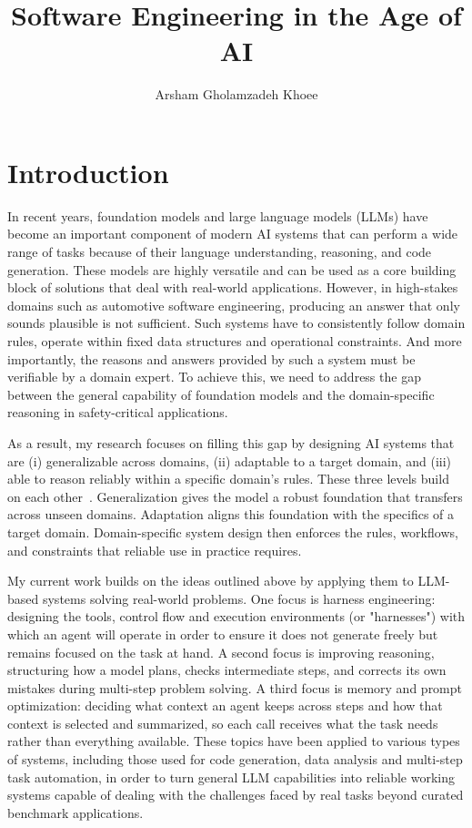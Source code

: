 \documentclass[11pt]{article}
\title{\vspace{-3em}Software Engineering in the Age of AI}
\author{Arsham Gholamzadeh Khoee}
\date{}
\begin{document}
\maketitle
\vspace{-2em}


\section{Introduction}

In recent years, foundation models and large language models (LLMs) have become an important component of modern AI systems that can perform a wide range of tasks because of their language understanding, reasoning, and code generation. These models are highly versatile and can be used as a core building block of solutions that deal with real-world applications. However, in high-stakes domains such as automotive software engineering, producing an answer that only sounds plausible is not sufficient. Such systems have to consistently follow domain rules, operate within fixed data structures and operational constraints. And more importantly, the reasons and answers provided by such a system must be verifiable by a domain expert. To achieve this, we need to address the gap between the general capability of foundation models and the domain-specific reasoning in safety-critical applications.

As a result, my research focuses on filling this gap by designing AI systems that are (i) generalizable across domains, (ii) adaptable to a target domain, and (iii) able to reason reliably within a specific domain's rules. These three levels build on each other~\citep{khoee2026towards}. Generalization gives the model a robust foundation that transfers across unseen domains. Adaptation aligns this foundation with the specifics of a target domain. Domain-specific system design then enforces the rules, workflows, and constraints that reliable use in practice requires.

My current work builds on the ideas outlined above by applying them to LLM-based systems solving real-world problems. One focus is harness engineering: designing the tools, control flow and execution environments (or "harnesses") with which an agent will operate in order to ensure it does not generate freely but remains focused on the task at hand. A second focus is improving reasoning, structuring how a model plans, checks intermediate steps, and corrects its own mistakes during multi-step problem solving. A third focus is memory and prompt optimization: deciding what context an agent keeps across steps and how that context is selected and summarized, so each call receives what the task needs rather than everything available. These topics have been applied to various types of systems, including those used for code generation, data analysis and multi-step task automation, in order to turn general LLM capabilities into reliable working systems capable of dealing with the challenges faced by real tasks beyond curated benchmark applications.
\end{document}
